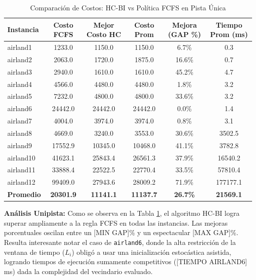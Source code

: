 \documentclass[letter, 10pt]{article}
\begin{document}
\begin{table}[htbp]
\centering
\caption{Comparación de Costos: HC-BI vs Política FCFS en Pista Única}
\label{tab:unipista}
\begin{tabular}{|l|c|c|c|c|c|}
\hline
\textbf{Instancia} & \textbf{Costo FCFS} & \textbf{Mejor Costo HC} & \textbf{Costo Prom} & \textbf{Mejora (GAP \%)} & \textbf{Tiempo Prom (ms)} \\ \hline
airland1 & 1233.0 & 1150.0 & 1150.0 & 6.7\% & 0.3 \\ \hline
airland2 & 2063.0 & 1720.0 & 1875.0 & 16.6\% & 0.7 \\ \hline
airland3 & 2940.0 & 1610.0 & 1610.0 & 45.2\% & 4.7 \\ \hline
airland4 & 4566.0 & 4480.0 & 4480.0 & 1.8\% & 3.2 \\ \hline
airland5 & 7232.0 & 4800.0 & 4800.0 & 33.6\% & 3.2 \\ \hline
airland6 & 24442.0 & 24442.0 & 24442.0 & 0.0\% & 1.4 \\ \hline
airland7 & 4004.0 & 3974.0 & 3974.0 & 0.8\% & 3.1 \\ \hline
airland8 & 4669.0 & 3240.0 & 3553.0 & 30.6\% & 3502.5 \\ \hline
airland9 & 17552.9 & 10345.0 & 10468.0 & 41.1\% & 3782.8 \\ \hline
airland10 & 41623.1 & 25843.4 & 26561.3 & 37.9\% & 16540.2 \\ \hline
airland11 & 33888.4 & 22522.5 & 22770.4 & 33.5\% & 57810.4 \\ \hline
airland12 & 99409.0 & 27943.6 & 28009.2 & 71.9\% & 177177.1 \\ \hline
\hline
\textbf{Promedio} & \textbf{20301.9} & \textbf{11141.1} & \textbf{11137.7} & \textbf{26.7\%} & \textbf{21569.1} \\ \hline
\end{tabular}
\end{table}

\newpage
\textbf{Análisis Unipista:} Como se observa en la Tabla \ref{tab:unipista}, el algoritmo HC-BI logra superar ampliamente a la regla FCFS en todas las instancias. Las mejoras porcentuales oscilan entre un [MIN GAP]\% y un espectacular [MAX GAP]\%. Resulta interesante notar el caso de \texttt{airland6}, donde la alta restricción de la ventana de tiempo ($L_i$) obligó a usar una inicialización estocástica asistida, logrando tiempos de ejecución sumamente competitivos ([TIEMPO AIRLAND6] ms) dada la complejidad del vecindario evaluado.
\end{document}
